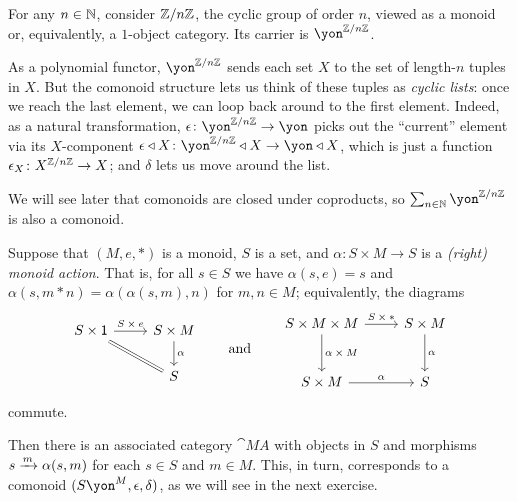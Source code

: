 \documentclass[Book-Poly]{subfiles}
\begin{document}
\begin{example}
For any $n\in\mathbb{N}$, consider $\mathbb{Z}/n\mathbb{Z}$, the cyclic group of order $n$, viewed as a monoid or, equivalently, a $1$-object category.
Its carrier is $\yon^{\zz/n\zz}$.

As a polynomial functor, $\yon^{\zz/n\zz}$ sends each set $X$ to the set of length-$n$ tuples in $X$.
But the comonoid structure lets us think of these tuples as \emph{cyclic lists}: once we reach the last element, we can loop back around to the first element.
Indeed, as a natural transformation, $\epsilon\colon\yon^{\zz/n\zz}\to\yon$ picks out the ``current'' element via its $X$-component $\epsilon\tri X\colon\yon^{\zz/n\zz}\tri X\to\yon\tri X$, which is just a function $\epsilon_X\colon X^{\mathbb{Z}/n\mathbb{Z}}\to X$; and $\delta$ lets us move around the list.

We will see later that comonoids are closed under coproducts, so $\sum_{n\in\nn}\yon^{\zz/n\zz}$ is also a comonoid.
\end{example}

\begin{example}\label{ex.monoid_action}
Suppose that $(M,e,*)$ is a monoid, $S$ is a set, and $\alpha\colon S\times M\to S$ is a \emph{(right) monoid action}.
That is, for all $s\in S$ we have $\alpha(s,e)=s$ and $\alpha(s,m*n)=\alpha(\alpha(s,m),n)$ for $m,n\in M$; equivalently, the diagrams
\[
\begin{tikzcd}
	S\times\1\ar[rd,equals]\ar[r,"S\:\times\:e"] & S\times M\ar[d,"\alpha"]\\
	& S
\end{tikzcd}
\qqand
\begin{tikzcd}[row sep=large]
    S\times M\times M\ar[r,"S\:\times\:*"]\ar[d,"\alpha\:\times\:M"] & S\times M\ar[d,"\alpha"]\\
    S\times M\ar[r,"\alpha"] & S
\end{tikzcd}
\]
commute.

Then there is an associated category $\cat{M\!A}$ with objects in $S$ and morphisms $s\xrightarrow{m}\alpha(s,m)$ for each $s\in S$ and $m\in M$.
This, in turn, corresponds to a comonoid $(S\yon^M,\epsilon,\delta)$, as we will see in the next exercise.
\end{example}
\end{document}
